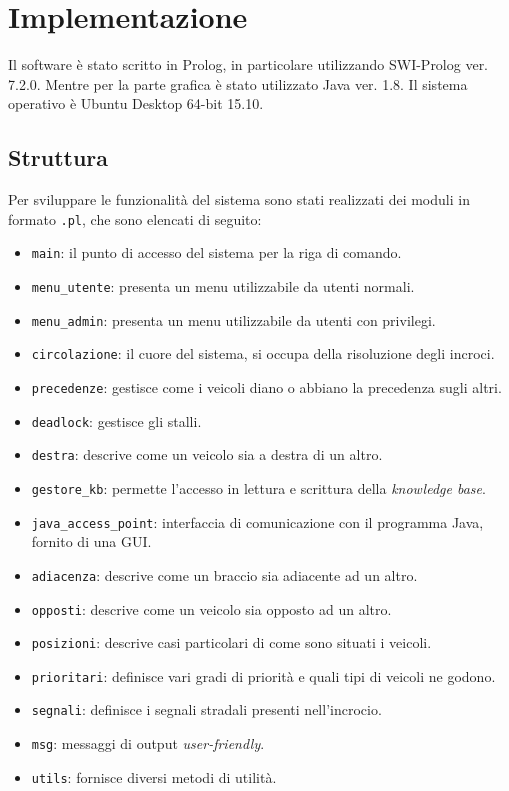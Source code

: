 \chapter{Implementazione}

Il software è stato scritto in Prolog, in particolare utilizzando SWI-Prolog ver. 7.2.0. Mentre per la parte grafica è stato utilizzato Java ver. 1.8. Il sistema operativo è Ubuntu Desktop 64-bit 15.10.

\section{Struttura}
Per sviluppare le funzionalità del sistema sono stati realizzati dei moduli in formato \texttt{.pl}, che sono elencati di seguito:
\begin{itemize}
\item \texttt{main}: il punto di accesso del sistema per la riga di comando.
\item \texttt{menu\_utente}: presenta un menu utilizzabile da utenti normali.
\item \texttt{menu\_admin}: presenta un menu utilizzabile da utenti con privilegi.
\item \texttt{circolazione}: il cuore del sistema, si occupa della risoluzione degli incroci.
\item \texttt{precedenze}: gestisce come i veicoli diano o abbiano la precedenza sugli altri.
\item \texttt{deadlock}: gestisce gli stalli.
\item \texttt{destra}: descrive come un veicolo sia a destra di un altro.
\item \texttt{gestore\_kb}: permette l'accesso in lettura e scrittura della \emph{knowledge base}.
\item \texttt{java\_access\_point}: interfaccia di comunicazione con il programma Java, fornito di una GUI.
\item \texttt{adiacenza}: descrive come un braccio sia adiacente ad un altro.
\item \texttt{opposti}: descrive come un veicolo sia opposto ad un altro.
\item \texttt{posizioni}: descrive casi particolari di come sono situati i veicoli.
\item \texttt{prioritari}: definisce vari gradi di priorità e quali tipi di veicoli ne godono.
\item \texttt{segnali}: definisce i segnali stradali presenti nell'incrocio.
\item \texttt{msg}: messaggi di output \emph{user-friendly}.
\item \texttt{utils}: fornisce diversi metodi di utilità.
\end{itemize}

